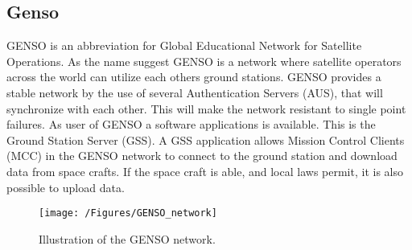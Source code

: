 \subsection{Genso}
GENSO is an abbreviation for Global Educational Network for Satellite Operations. As the name suggest GENSO is a network where satellite operators across the world can utilize each others ground stations. GENSO provides a stable network by the use of several Authentication Servers (AUS), that will synchronize with each other. This will make the network resistant to single point failures. As user of GENSO a software applications is available. This is the Ground Station Server (GSS). A GSS application allows Mission Control Clients (MCC) in the GENSO network to connect to the ground station and download data from space crafts. If the space craft is able, and local laws permit, it is also possible to upload data.   

\begin{figure}
\begin{center}
\texttt{[image: /Figures/GENSO\_network]}
\end{center}
\caption{Illustration of the GENSO network.}
\label{GENSO_network}
\end{figure}
    